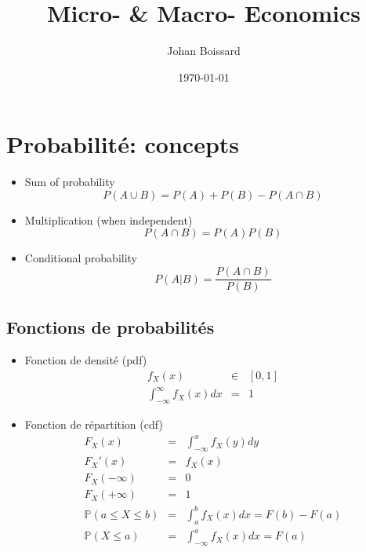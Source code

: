 \documentclass[a4paper,titlepage] {scrartcl}
\author{Johan Boissard}
\date{\today}
\title{Micro- \& Macro- Economics}
\begin{document}

\section{Probabilité: concepts}

\begin{itemize}
	\item Sum of probability
	\begin{equation}
		P(A\cup B) = P(A) + P(B) - P(A\cap B)
	\end{equation}
	\item Multiplication (when independent)
	\begin{equation}
		P(A\cap B) = P(A)P(B)
	\end{equation}
	\item Conditional probability
	\begin{equation}
		P(A|B) = \frac{P(A\cap B)}{P(B)}
	\end{equation}
\end{itemize}

\subsection{Fonctions de probabilités}
\begin{itemize}
	\item Fonction de densité (pdf)
	\begin{eqnarray}
		f_X(x) &\in& [0,1]\\
		\int_{-\infty}^{\infty}f_X(x)dx &=& 1
	\end{eqnarray}
	\item Fonction de répartition (cdf)
	\begin{eqnarray}
		F_X(x) &=& \int_{-\infty}^xf_X(y)dy\\
		F_X'(x) &=& f_X(x)\\		
		F_X(-\infty) &=& 0\\
		F_X(+\infty) &=& 1\\
		\mathbb P(a\leq X\leq b) &=& \int_a^bf_X(x)dx = F(b)-F(a)\\
		\mathbb P( X\leq a) &=& \int_{-\infty}^af_X(x)dx = F(a)
	\end{eqnarray}
\end{itemize}
\end{document}
